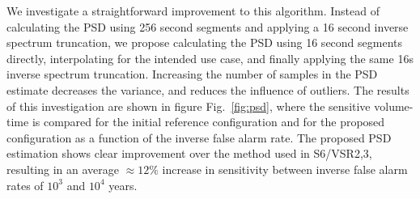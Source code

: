 We investigate a straightforward improvement to this algorithm. Instead of calculating the PSD using 256 second segments and applying a 16 second inverse spectrum truncation, we propose calculating the PSD using 16 second segments directly, interpolating for the intended use case, and finally applying the same 16s inverse spectrum truncation. Increasing the number of samples in the PSD estimate decreases the variance, and reduces the influence of outliers. The results of this investigation are shown in figure Fig.~\ref{fig:psd}, where the sensitive volume-time is compared for the initial reference configuration and for the proposed configuration as a function of the inverse false alarm rate. The proposed PSD estimation shows clear improvement over the method used in S6/VSR2,3, resulting in an average $\approx 12\%$ increase in sensitivity between inverse false alarm rates of $10^3$ and $10^4$ years.  




